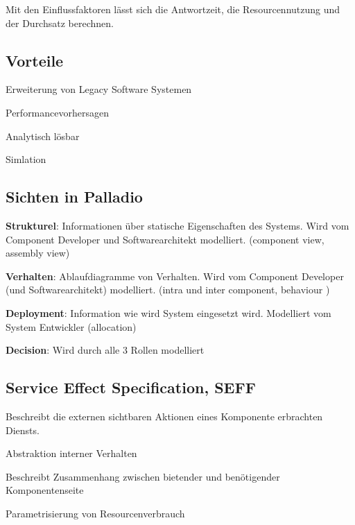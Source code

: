 Mit den Einflussfaktoren lässt sich die Antwortzeit, die Resourcennutzung und der
Durchsatz berechnen.

\subsection{Vorteile}
\begin{compactitem}
    \item Erweiterung von Legacy Software Systemen
    \item Performancevorhersagen
    \item Analytisch lösbar
    \item Simlation
\end{compactitem}

\subsection{Sichten in Palladio}
\begin{compactitem}
    \item \textbf{Strukturel}: Informationen über statische Eigenschaften des Systems.
    Wird vom Component Developer und Softwarearchitekt modelliert. (component view, assembly view)
    \item \textbf{Verhalten}: Ablaufdiagramme von Verhalten. Wird vom Component
    Developer (und Softwarearchitekt) modelliert. (intra und inter component, behaviour )
    \item \textbf{Deployment}: Information wie wird System eingesetzt wird.
    Modelliert vom System Entwickler (allocation)
    \item \textbf{Decision}: Wird durch alle 3 Rollen modelliert
\end{compactitem}

\subsection{Service Effect Specification, SEFF}
\begin{compactitem}
        \item Beschreibt die externen sichtbaren Aktionen eines Komponente erbrachten Diensts.
        \item Abstraktion interner Verhalten
        \item Beschreibt Zusammenhang zwischen bietender und benötigender Komponentenseite
        \item Parametrisierung von Resourcenverbrauch
\end{compactitem}
